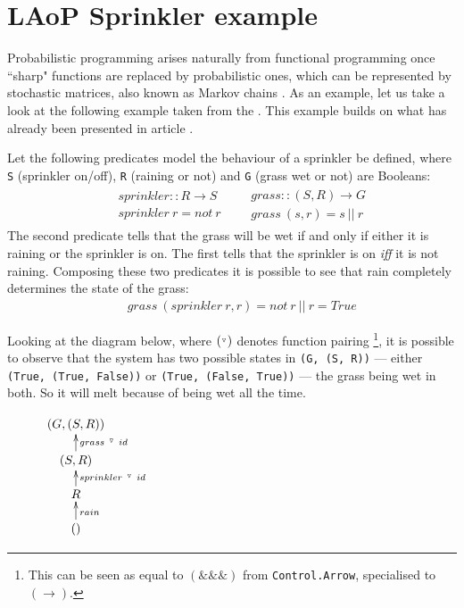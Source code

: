 \documentclass[
  oneside,
  11pt, a4paper,
  footinclude=true,
  headinclude=true,
  cleardoublepage=empty
]{scrbook}
\theoremstyle{definition}
\theoremstyle{definition}
\def\start{&&}
\def\more{\\&&}
\def\kr{\mathbin{\hbox{\tiny${}^\triangledown$}}}
\begin{document}
        \section{LAoP Sprinkler example}
        
        Probabilistic programming arises naturally from functional programming once ``sharp" functions are replaced by probabilistic ones, which can be represented by stochastic matrices, also known as Markov chains \citep{oliveira2012towards}. As an example, let us take a look at the following example taken from the \citet{wiki:BayesianNetwork}. This example builds on what has already been presented in article \cite{Armando2020}. 
        
        Let the following predicates model the behaviour of a sprinkler be defined, where \texttt{S} (sprinkler on/off), \texttt{R} (raining or not) and \texttt{G} (grass wet or not) are Booleans:
        \begin{eqnarray*}
        \begin{array}{rcl}
        \start sprinkler :: R \to S
        \more sprinkler\ r = not\ r
        \end{array}
        \begin{array}{rcl}
        \start grass :: (S, R) \to G
        \more grass\ (s,r) = s\ ||\ r
        \end{array}
        \end{eqnarray*}
        The second predicate tells that the grass will be wet if and only if either it is raining or the sprinkler is on. The first tells that the sprinkler is on \emph{iff} it is not raining. Composing these two predicates it is possible to see that rain completely determines the state of the grass:
        \begin{eqnarray*}
        \start grass\ (sprinkler\ r,r) = not\ r\ ||\ r = True
        \end{eqnarray*}
        
        Looking at the diagram below, where $(\kr)$ denotes function pairing \footnote{This can be seen as equal to $(\&\&\&)$ from \texttt{Control.Arrow}, specialised to $(\rightarrow)$.}, it is possible to observe that the system has two possible states in \texttt{(G, (S, R))} --- either \texttt{(True, (True, False))} or \texttt{(True, (False, True))} --- the grass being wet in both. So it will melt because of being wet all the time.
        
        \begin{figure}[h]%
        \centering
        \(
        \xymatrix@R=1.3em{
        	(G, (S, R))
        \\
        	(S, R)
        		\ar[u]_{grass\ \kr\ id}
        \\
        	R
        		\ar[u]_{sprinkler\ \kr\ id}
        \\
        	()
        		\ar[u]_{rain}
        }
        \)
        \end{figure}
        
\end{document}

